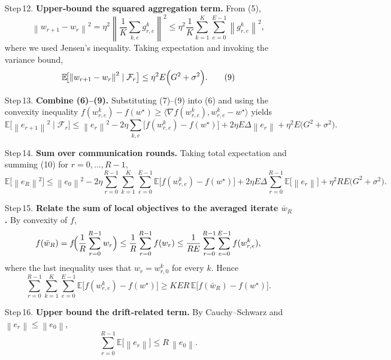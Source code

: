 \documentclass{article}
\newcommand{\EE}{\mathbb{E}}
\newcommand{\norm}[1]{\left\lVert#1\right\rVert}
\newcommand{\inner}[2]{\langle #1,#2\rangle}
\newcommand{\grad}{\nabla}
\begin{document}
\begin{enumerate}
\item[Step 12.] \textbf{Upper‑bound the squared aggregation term.}
      From (5),
      \[
      \norm{w_{r+1}-w_r}^{2}
      =\eta^{2}\norm{
          \frac1K\sum_{k,e} g_{r,e}^{k}}^{2}
      \le \eta^{2}\frac1K\sum_{k=1}^{K}\sum_{e=0}^{E-1}
          \norm{g_{r,e}^{k}}^{2},
      \]
      where we used Jensen’s inequality.
      Taking expectation and invoking the variance bound,
      \[
      \EE\!\bigl[\norm{w_{r+1}-w_r}^{2}\mid\mathcal{F}_r\bigr]
      \le \eta^{2}E\Bigl(G^{2}+\sigma^{2}\Bigr). \tag{9}
      \]

\item[Step 13.] \textbf{Combine (6)–(9).}
      Substituting (7)–(9) into (6) and using the convexity inequality
      $f(w_{r,e}^{k})-f(w^\star)\ge\inner{\grad f(w_{r,e}^{k})}{w_{r,e}^{k}-w^\star}$
      yields
      \[
      \EE\!\bigl[\norm{e_{r+1}}^{2}\mid\mathcal{F}_r\bigr]
      \le \norm{e_{r}}^{2}
        -2\eta\sum_{k,e}\bigl[f(w_{r,e}^{k})-f(w^\star)\bigr]
        +2\eta E\Delta\norm{e_r}
        +\eta^{2}E\bigl(G^{2}+\sigma^{2}\bigr). \tag{10}
      \]

\item[Step 14.] \textbf{Sum over communication rounds.}
      Taking total expectation and summing (10) for $r=0,\dots,R-1$,
      \[
      \EE\!\bigl[\norm{e_{R}}^{2}\bigr]
      \le \norm{e_{0}}^{2}
        -2\eta\sum_{r=0}^{R-1}\sum_{k=1}^{K}\sum_{e=0}^{E-1}
                \EE\!\bigl[f(w_{r,e}^{k})-f(w^\star)\bigr]
        +2\eta E\Delta\sum_{r=0}^{R-1}\EE\!\bigl[\norm{e_r}\bigr]
        +\eta^{2}RE\bigl(G^{2}+\sigma^{2}\bigr). \tag{11}
      \]

\item[Step 15.] \textbf{Relate the sum of local objectives to the
      averaged iterate $\bar w_R$.}
      By convexity of $f$,
      \[
      f(\bar w_R)
      = f\!\Bigl(\frac1R\sum_{r=0}^{R-1} w_r\Bigr)
      \le \frac1R\sum_{r=0}^{R-1} f(w_r)
      \le \frac1{RE}\sum_{r=0}^{R-1}\sum_{e=0}^{E-1} f(w_{r,e}^{k}),
      \]
      where the last inequality uses that $w_{r}=w_{r,0}^{k}$ for every $k$.
      Hence
      \[
      \sum_{r=0}^{R-1}\sum_{k=1}^{K}\sum_{e=0}^{E-1}
          \EE\!\bigl[f(w_{r,e}^{k})-f(w^\star)\bigr]
      \ge K E R\,
          \EE\!\bigl[f(\bar w_R)-f(w^\star)\bigr]. \tag{12}
      \]

\item[Step 16.] \textbf{Upper bound the drift‑related term.}
      By Cauchy–Schwarz and $\norm{e_r}\le \norm{e_0}$,
      \[
      \sum_{r=0}^{R-1}\EE\!\bigl[\norm{e_r}\bigr]
      \le R\,\norm{e_0}. \tag{13}
      \]


\end{enumerate}
\end{document}
